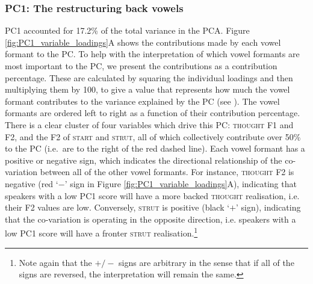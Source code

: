 \documentclass[review]{elsarticle} %
\begin{document}

\subsubsection{PC1: The restructuring back vowels}
\label{sec:PC1}




PC1 accounted for 17.2\% of the total variance in the PCA.  Figure \ref{fig:PC1_variable_loadings}A shows the contributions made by each vowel formant to the PC. To help with the interpretation of which vowel formants are most important to the PC, we present the contributions as a contribution percentage. These are calculated by squaring the individual loadings and then multiplying them by 100, to give a value that represents how much the vowel formant contributes to the variance explained by the PC (see \citealt{PCAIntro}).  The vowel formants are ordered left to right as a function of their contribution percentage. There is a clear cluster of four variables which drive this PC: \textsc{thought} F1 and F2, and the F2 of \textsc{start} and \textsc{strut}, all of which collectively contribute over 50\% to the PC (i.e.\ are to the right of the red dashed line). Each vowel formant has a positive or negative sign, which indicates the directional relationship of the co-variation between all of the other vowel formants. For instance, \textsc{thought} F2 is negative (red `$-$' sign in Figure \ref{fig:PC1_variable_loadings}A), indicating that speakers with a low PC1 score will have a more backed \textsc{thought} realisation, i.e. their F2 values are low. Conversely, \textsc{strut} is positive (black `$+$' sign), indicating that the co-variation is operating in the opposite direction, i.e. speakers with a low PC1 score will have a fronter \textsc{strut} realisation.\footnote{Note again that the $+/-$ signs are arbitrary in the sense that if all of the signs are reversed, the interpretation will remain the same.}
\end{document}
